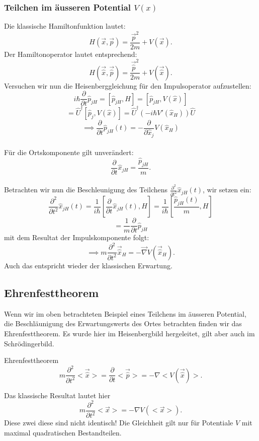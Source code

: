 \documentclass{report}
\begin{document}
\subsubsection{Teilchen im äusseren Potential $V(x)$ }
Die klassische Hamiltonfunktion lautet: \[
	H(\vec{x},\vec{p}) = \frac{\vec{p}^2}{2m} + V(\vec{x})
.\] Der Hamiltonoperator lautet entsprechend: \[
	H(\vec{\hat{x}},\vec{\hat{p}}) = \frac{\vec{\hat{p}}^2}{2m} + V(\vec{\hat{x}})
.\] 
Versuchen wir nun die Heisenberggleichung für den Impulsoperator aufzustellen: \[
	i\hbar \frac{\partial}{\partial t}\hat{p}_{jH} = [\hat{p}_{jH}, H] = [\hat{p}_{jH}, V(\hat{x})]
\] \[
= \hat{U}^\dagger [\hat{p}_j, V(\hat{x})] = \hat{U}^\dagger (-i\hbar V'(\hat{x}_H)) \hat{U}
\] \[
\implies \frac{\partial}{\partial t} \hat{p}_{jH}(t) = - \frac{\partial}{\partial \hat{x}_j} V(\hat{x}_H)
\] \\
Für die Ortskomponente gilt unverändert: \[
	\frac{\partial}{\partial t} \hat{x}_{jH} = \frac{\hat{p}_{jH}}{m}
.\] \\
Betrachten wir nun die Beschleunigung des Teilchens $\frac{\partial^2}{\partial t^2}\hat{x}_{jH}(t)$, wir setzen ein: \[
	\frac{\partial^2}{\partial t^2} \hat{x}_{jH}(t) = \frac{1}{i\hbar } [\frac{\partial}{\partial t}\hat{x}_{jH}(t), H] = \frac{1}{i\hbar } [\frac{\hat{p}_{jH}(t)}{m}, H]
\] \[
= \frac{1}{m} \frac{\partial}{\partial t} \hat{p}_{jH}
\] mit dem Resultat der Impulskomponente folgt: \[
\implies m\frac{\partial^2}{\partial t^2}\vec{\hat{x}}_{H} = - \vec{\nabla} V(\vec{\hat{x}}_H)
.\]  Auch das entspricht wieder der klassischen Erwartung.
\subsection{Ehrenfesttheorem}
Wenn wir im oben betrachteten Beispiel eines Teilchens im äusseren Potential, die Beschläunigung des Erwartungswerts des Ortes betrachten finden wir das Ehrenfesttheorem. Es wurde hier im Heisenbergbild hergeleitet, gilt aber auch im Schrödingerbild.
\begin{redbox}{Ehrenfesttheorem}
	\[
		m \frac{\partial^2}{\partial t^2} <\vec{\hat{x}}> = \frac{\partial}{\partial t} <\vec{\hat{p}}> = - \nabla  <V(\vec{\hat{x}})>
	.\] 
\end{redbox}
Das klassische Resultat lautet hier \[
	m \frac{\partial^2}{\partial t^2} <\vec{x}> = -\nabla V(<\vec{x}>)
.\] Diese zwei diese sind nicht identisch! Die Gleichheit gilt nur für Potentiale $V$ mit maximal quadratischen Bestandteilen.
\end{document}
